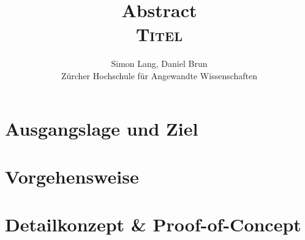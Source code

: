 \documentclass[11pt,a4paper,ngerman]{article}
\begin{document}
\rmfamily\large  
\title{\textbf{Abstract} \\ \rmfamily\huge  \textsc{Titel}}
\author{Simon Lang, Daniel Brun\\
Zürcher Hochschule für Angewandte Wissenschaften
}
\date{} %
\maketitle\thispagestyle{empty} %

\rmfamily\normalsize
\setlength{\parindent}{0pt}
\section*{Ausgangslage und Ziel}

\section*{Vorgehensweise}

\section*{Detailkonzept \& Proof-of-Concept}

\end{document}
